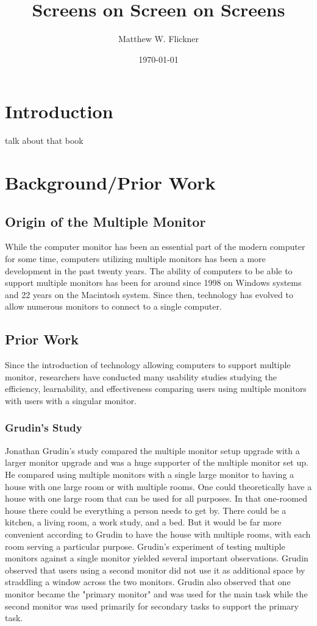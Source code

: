 \documentclass[a4paper]{article}
\title{Screens on Screen on Screens}
\author{Matthew W. Flickner}
\date{\today}
\begin{document}
\maketitle

\begin{abstract}
\end{abstract}

\section{Introduction}

talk about that book

\section{Background/Prior Work}
\subsection{Origin of the Multiple Monitor}
While the computer monitor has been an essential part of the modern computer for some time, computers utilizing multiple monitors has been a more development in the past twenty years. The ability of computers to be able to support multiple monitors has been for around since 1998 on Windows systems and 22 years on the Macintosh system.\cite{Grudin}  Since then, technology has evolved to allow numerous monitors to connect to a single computer.

\subsection{Prior Work}
Since the introduction of technology allowing computers to support multiple monitor, researchers have conducted many usability studies studying the efficiency, learnability, and effectiveness comparing users using multiple monitors with users with a singular monitor.

\subsubsection{Grudin's Study}
Jonathan Grudin's study compared the multiple monitor setup upgrade with a larger monitor upgrade and was a huge supporter of the multiple monitor set up. He compared using multiple monitors with a single large monitor to having a house with one large room or with multiple rooms. One could theoretically have a house with one large room that can be used for all purposes. In that one-roomed house there could be everything a person needs to get by. There could be a kitchen, a living room, a work study, and a bed. But it would be far more convenient according to Grudin to have the house with multiple rooms, with each room serving a particular purpose.\cite{Grudin} Grudin's experiment of testing multiple monitors against a single monitor yielded several important observations. Grudin observed that users using a second monitor did not use it as additional space by straddling a window across the two monitors.\cite{Grudin} Grudin also observed that one monitor became the "primary monitor" and was used for the main task while the second monitor was used primarily for secondary tasks to support the primary task.
\end{document}
